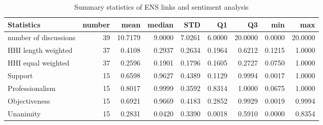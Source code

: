 \documentclass{article}
\begin{document}
\begin{table}[ht]
    \centering
    \small
\begin{tabular}{lrrrrrrrr}
\toprule
Statistics & number & mean & median & STD & Q1 & Q3 & min & max \\
\midrule
number of discussions & 39 & 10.7179 & 9.0000 & 7.0261 & 6.0000 & 20.0000 & 0.0000 & 20.0000 \\
HHI length weighted & 37 & 0.4108 & 0.2937 & 0.2634 & 0.1964 & 0.6212 & 0.1215 & 1.0000 \\
HHI equal weighted & 37 & 0.2596 & 0.1901 & 0.1796 & 0.1605 & 0.2727 & 0.0750 & 1.0000 \\
\midrule
Support & 15 & 0.6598 & 0.9627 & 0.4389 & 0.1129 & 0.9994 & 0.0017 & 1.0000 \\
Professionalism & 15 & 0.8017 & 0.9999 & 0.3592 & 0.8314 & 1.0000 & 0.0675 & 1.0000 \\
Objectiveness & 15 & 0.6921 & 0.9669 & 0.4183 & 0.2852 & 0.9929 & 0.0019 & 0.9994 \\
Unanimity & 15 & 0.2831 & 0.0420 & 0.3390 & 0.0018 & 0.5910 & 0.0000 & 0.8354 \\
\bottomrule
\end{tabular}
    \caption{Summary statistics of ENS links and sentiment analysis}
\end{table}
\end{document}
